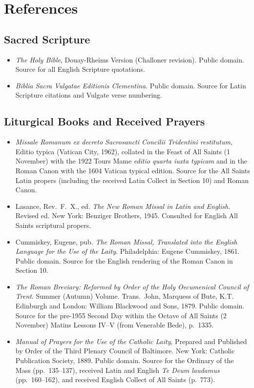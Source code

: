 \section{References}

\begingroup
\small
\ifdefined\TriptychPrintEdition
{}
\else
\fi
\subsection*{Sacred Scripture}

\begin{itemize}
\item \textit{The Holy Bible}, Douay-Rheims Version (Challoner revision). Public domain. Source for all English Scripture quotations.
\item \textit{Biblia Sacra Vulgatae Editionis Clementina}. Public domain. Source for Latin Scripture citations and Vulgate verse numbering.
\end{itemize}

\subsection*{Liturgical Books and Received Prayers}

\begin{itemize}
\item \textit{Missale Romanum ex decreto Sacrosancti Concilii Tridentini restitutum}, Editio typica (Vatican City, 1962), collated in the Feast of All Saints (1 November) with the 1922 Tours Mame \textit{editio quarta iuxta typicam} and in the Roman Canon with the 1604 Vatican typical edition. Source for the All Saints Latin propers (including the received Latin Collect in Section 10) and Roman Canon.
\item Lasance, Rev.\ F.\ X., ed. \textit{The New Roman Missal in Latin and English}. Revised ed. New York: Benziger Brothers, 1945. Consulted for English All Saints scriptural propers.
\item Cummiskey, Eugene, pub. \textit{The Roman Missal, Translated into the English Language for the Use of the Laity}. Philadelphia: Eugene Cummiskey, 1861. Public domain. Source for the English rendering of the Roman Canon in Section 10.
\item \textit{The Roman Breviary: Reformed by Order of the Holy Oecumenical Council of Trent}. Summer (Autumn) Volume. Trans.\ John, Marquess of Bute, K.T. Edinburgh and London: William Blackwood and Sons, 1879. Public domain. Source for the pre-1955 Second Day within the Octave of All Saints (2 November) Matins Lessons IV--V (from Venerable Bede), p.\ 1335.
\item \textit{Manual of Prayers for the Use of the Catholic Laity}, Prepared and Published by Order of the Third Plenary Council of Baltimore. New York: Catholic Publication Society, 1889. Public domain. Source for the Ordinary of the Mass (pp.\ 135--137), received Latin and English \textit{Te Deum laudamus} (pp.\ 160--162), and received English Collect of All Saints (p.\ 773).
\end{itemize}

